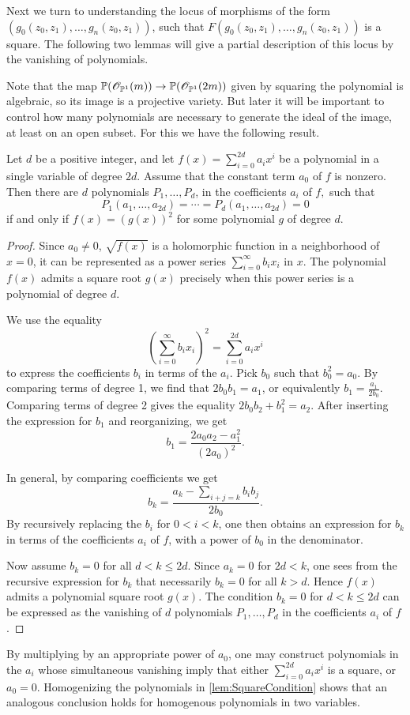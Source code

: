 Next we turn to understanding the locus of morphisms of the form $(g_0(z_0,z_1),\dots,g_n(z_0,z_1))$, such that $F(g_0(z_0,z_1),\dots,g_n(z_0,z_1))$ is a square. The following two lemmas will give a partial description of this locus by the vanishing of polynomials.

Note that the map $\mathbb{P}(\mathscr{O}_{\mathbb{P}^1}(m)) \to \mathbb{P}(\mathscr{O}_{\mathbb{P}^1}(2m))$ given by squaring the polynomial is algebraic, so its image is a projective variety. But later it will  be important to control how many polynomials are necessary to generate the ideal of the image, at least on an open subset. For this we have the following result.

\begin{lemma}
	\label{lem:SquareCondition}
  Let $d$ be a positive integer, and let $f(x) = \sum_{i=0}^{2d}a_ix^i$ be a polynomial in a single variable of degree $2d$. Assume that the constant term $a_0$ of $f$ is nonzero. Then there are $d$ polynomials $P_1,\dots,P_d$, in the coefficients $a_i$ of $f,$ such that
\[P_1(a_1,\dots,a_{2d}) = \cdots = P_d(a_1,\dots,a_{2d}) = 0\]
if and only if $f(x) = (g(x))^2$ for some polynomial $g$ of degree $d$.
\end{lemma}
\begin{proof}
  Since $a_0 \neq 0$, $\sqrt{f(x)}$ is a holomorphic function in a neighborhood of $x=0$, it can be represented as a power series $\sum_{i=0}^\infty b_ix_i$ in $x$. The polynomial $f(x)$ admits a square root $g(x)$ precisely when this power series is a polynomial of degree $d$.

We use the equality
\[(\sum_{i=0}^\infty b_ix_i)^2 = \sum_{i=0}^{2d}a_ix^i \]
to express the coefficients $b_i$ in terms of the $a_i$. Pick $b_0$ such that $b_0^2 = a_0$. By comparing terms of degree 1, we find that $2b_0b_1 = a_1$, or equivalently $b_1 = \frac{a_1}{2b_0}$. Comparing terms of degree 2 gives the equality $2b_0b_2 + b_1^2 = a_2$. After inserting the expression for $b_1$ and reorganizing, we get
\[b_1 = \frac{2a_0a_2 - a_1^2}{(2a_0)^2}.\]

In general, by comparing coefficients we get
\[ b_k = \frac{a_k - \sum_{i+j = k}b_ib_j}{2b_0}.\]
By recursively replacing the $b_i$ for $0<i<k$, one then obtains an expression for $b_k$ in terms of the coefficients $a_i$ of $f$, with a power of $b_0$ in the denominator.

Now assume $b_k = 0$ for all $d < k \leq 2d$. Since $a_k = 0$ for $2d<k$, one sees from the recursive expression for $b_k$ that necessarily $b_k=0$ for all $k>d$. Hence $f(x)$ admits a polynomial square root $g(x)$. The condition $b_k = 0$ for $d<k\leq 2d$ can be expressed as the vanishing of $d$ polynomials $P_1,\dots,P_d$ in the coefficients $a_i$ of $f$.
\end{proof}
\begin{remark}
  By multiplying by an appropriate power of $a_0$, one may construct polynomials in the $a_i$ whose simultaneous vanishing imply that either $\sum_{i=0}^{2d}a_ix^i$ is a square, or $a_0 = 0$. Homogenizing the polynomials in \cref{lem:SquareCondition} shows that an analogous conclusion holds for homogenous polynomials in two variables.
\end{remark}

